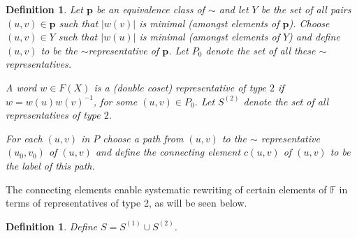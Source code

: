 \documentclass[a4paper,12pt]{article}
\newcommand{\pp}{\mathbf{p}}
\newtheorem{definition}[theorem]{Definition}
\numberwithin{equation}{section}
\numberwithin{figure}{section}
\newcommand{\FF}{\ensuremath{\mathbb{F}}}
\begin{document}
\begin{definition}
Let $\pp$ be an equivalence
class of $\sim$ and let $Y$ be the set of all pairs $(u,v)\in \pp$
such that $|w(v)|$ is minimal (amongst elements of $\pp$). Choose
$(u,v)\in Y$ such that $|w(u)|$ is minimal (amongst elements of
$Y$) and define $(u,v)$ to be the $\sim${\em representative} of
$\pp$. %
Let $P_0$ denote the set of  all these $\sim$ 
representatives.

A word $w\in F(X)$ is
 a {\em (double coset) representative of type} $2$ 
if $w=w(u)w(v)^{-1}$, for some $(u,v)\in P_0$.
Let $S^{(2)}$ denote the set of all representatives of type $2$.

For each $(u,v)$ in $P$ choose a path from $(u,v)$ to the $\sim$ representative
$(u_0,v_0)$ of $(u,v)$ and define the {\em connecting element}
$c(u,v)$  of $(u,v)$ to be the label of this path.  
\end{definition}
The  connecting elements enable systematic rewriting of certain
elements of $\FF$ in terms of representatives of type 2, as will be
seen below.
\begin{definition}
Define $S=S^{(1)}\cup S^{(2)}$. 
\end{definition}
\end{document}
